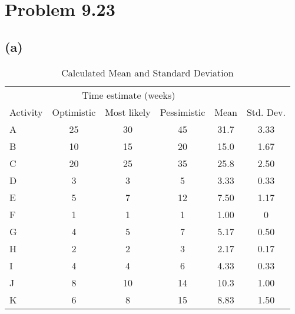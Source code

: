 \documentclass{article}
\begin{document}
	\pagebreak
	\section*{Problem 9.23}
	\subsection*{(a)}
		{\renewcommand{\arraystretch}{1.2} 
	\begin{table}[h!tbp]
  		\begin{center}
    		\caption{Calculated Mean and Standard Deviation}
    		\label{tab:table3}
			
    		\begin{tabular}{lccccc}
				\hline
				&\multicolumn{3}{c}{Time estimate (weeks)} &&\\\cline{2-4}
				Activity & Optimistic & Most likely & Pessimistic & Mean & Std. Dev.\\
				\hline
				A & 25 & 30 & 45 & 31.7 & 3.33\\
				B & 10 & 15 & 20 & 15.0 & 1.67\\
				C & 20 & 25 & 35 & 25.8 & 2.50\\
				D &  3 &  3 &  5 & 3.33 & 0.33\\
				E &  5 &  7 & 12 & 7.50 & 1.17\\
				F &  1 &  1 &  1 & 1.00 &    0\\
				G &  4 &  5 &  7 & 5.17 & 0.50\\
				H &  2 &  2 &  3 & 2.17 & 0.17\\
				I &  4 &  4 &  6 & 4.33 & 0.33\\
				J &  8 & 10 & 14 & 10.3 & 1.00\\
				K &  6 &  8 & 15 & 8.83 & 1.50\\
				\hline
    		\end{tabular}
  		\end{center}
	\end{table}
	}
	\begin{center}
	\makebox[\textwidth]{
		}
	\end{center}
	
	\pagebreak
	
\end{document}
